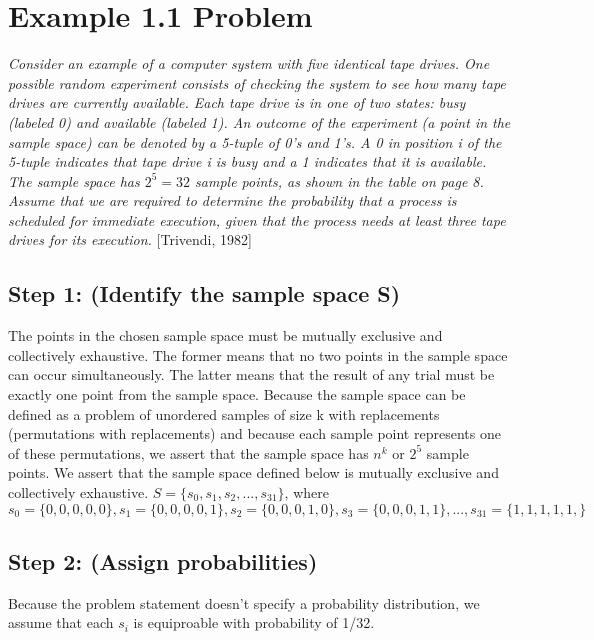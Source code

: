 \documentclass[a4paper,10pt]{article}
\title{}
\author{Mark Johnson \\
Loyola University Chicago}
\date {mjohnson4@luc.edu}
\begin{document}
\maketitle
\section{Example 1.1 Problem}
\emph{Consider an example of a computer system with five identical tape drives. One possible random experiment 
consists of checking the system to see how many tape drives are currently available. Each tape drive is in one of 
two states: busy (labeled 0) and available (labeled 1). An outcome of the experiment (a point in the sample space) 
can be denoted by a 5-tuple of 0's and 1's. A 0 in position i of the 5-tuple indicates that tape drive i is busy and 
a 1 indicates that it is available. The sample space has $ 2^{5}=32 $ sample points, as shown in the table on page 8. 
Assume that we are required to determine the probability that a process is scheduled for immediate execution, given 
that the process needs at least three tape drives for its execution.} [Trivendi, 1982]
\subsection{Step 1: (Identify the sample space S)}
The points in the chosen sample space must be mutually exclusive and collectively exhaustive. The former means that 
no two points in the sample space can occur simultaneously. The latter means that the result of any trial must be exactly 
one point from the sample space. Because the sample space can be defined as a problem of unordered samples of size k 
with replacements (permutations with replacements) and because each sample point represents one of these 
permutations, we assert that the sample space has $ n^{k} $ or $ 2^{5} $ sample points. We assert that the sample 
space defined below is mutually exclusive and collectively exhaustive. \newline
$ S = \{s_{0}, s_{1}, s_{2},..., s_{31}\} $, where $ s_{0} = \{0,0,0,0,0\}, s_{1} = \{0,0,0,0,1\}, s_{2} = \{0,0,0,1,0\}, s_{3} = \{0,0,0,1,1\},..., s_{31} = 
\{1,1,1,1,1,\} $
\subsection{Step 2: (Assign probabilities)}
Because the problem statement doesn't specify a probability distribution, we assume that each $ s_{i} $ is 
equiproable with probability of 1/32.
\end{document}
